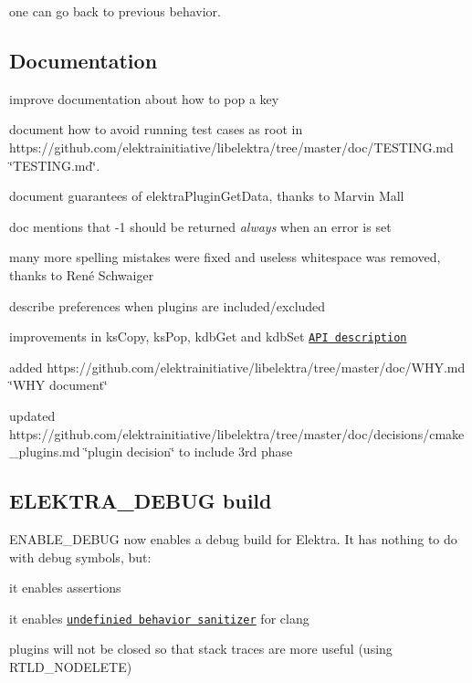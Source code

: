 one can go back to previous behavior.

\subsection*{Documentation}


\begin{DoxyItemize}
\item improve documentation about how to pop a key
\item document how to avoid running test cases as root in https\+://github.com/elektrainitiative/libelektra/tree/master/doc/\+T\+E\+S\+T\+I\+N\+G.\+md \char`\"{}\+T\+E\+S\+T\+I\+N\+G.\+md\char`\"{}.
\item document guarantees of {\ttfamily elektra\+Plugin\+Get\+Data}, thanks to Marvin Mall
\item doc mentions that -\/1 should be returned {\itshape always} when an error is set
\item many more spelling mistakes were fixed and useless whitespace was removed, thanks to René Schwaiger
\item describe preferences when plugins are included/excluded
\item improvements in {\ttfamily ks\+Copy}, {\ttfamily ks\+Pop}, {\ttfamily kdb\+Get} and {\ttfamily kdb\+Set} \href{http://doc.libelektra.org/api/0.8.17/html/}{\tt A\+P\+I description}
\item added https\+://github.com/elektrainitiative/libelektra/tree/master/doc/\+W\+H\+Y.\+md \char`\"{}\+W\+H\+Y document\char`\"{}
\item updated https\+://github.com/elektrainitiative/libelektra/tree/master/doc/decisions/cmake\+\_\+plugins.\+md \char`\"{}plugin decision\char`\"{} to include 3rd phase
\end{DoxyItemize}

\subsection*{E\+L\+E\+K\+T\+R\+A\+\_\+\+D\+E\+B\+U\+G build}

E\+N\+A\+B\+L\+E\+\_\+\+D\+E\+B\+U\+G now enables a debug build for Elektra. It has nothing to do with debug symbols, but\+:


\begin{DoxyItemize}
\item it enables assertions
\item it enables \href{http://clang.llvm.org/docs/UndefinedBehaviorSanitizer.html}{\tt undefinied behavior sanitizer} for clang
\item plugins will not be closed so that stack traces are more useful (using {\ttfamily R\+T\+L\+D\+\_\+\+N\+O\+D\+E\+L\+E\+T\+E})
\end{DoxyItemize}

